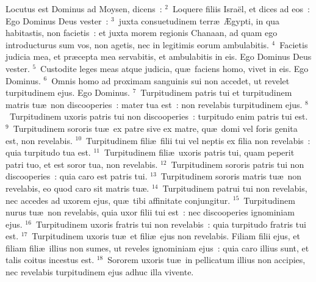 \lettrine[lines=3,image=true,loversize=0.05,lraise=-0.03]{L}{}ocutus est Dominus ad Moysen, dicens~:
${}^{2}$~Loquere filiis Isra\"el, et dices ad eos~: Ego Dominus Deus vester~:
${}^{3}$~juxta consuetudinem terr\ae\ \AE gypti, in qua habitastis, non facietis~: et juxta morem regionis Chanaan, ad quam ego introducturus sum vos, non agetis, nec in legitimis eorum ambulabitis.
${}^{4}$~Facietis judicia mea, et pr\ae cepta mea servabitis, et ambulabitis in eis. Ego Dominus Deus vester.
${}^{5}$~Custodite leges meas atque judicia, qu\ae\ faciens homo, vivet in eis. Ego Dominus.
${}^{6}$~Omnis homo ad proximam sanguinis sui non accedet, ut revelet turpitudinem ejus. Ego Dominus.
${}^{7}$~Turpitudinem patris tui et turpitudinem matris tu\ae\ non discooperies~: mater tua est~: non revelabis turpitudinem ejus.
${}^{8}$~Turpitudinem uxoris patris tui non discooperies~: turpitudo enim patris tui est.
${}^{9}$~Turpitudinem sororis tu\ae\ ex patre sive ex matre, qu\ae\ domi vel foris genita est, non revelabis.
${}^{10}$~Turpitudinem fili\ae\ filii tui vel neptis ex filia non revelabis~: quia turpitudo tua est.
${}^{11}$~Turpitudinem fili\ae\ uxoris patris tui, quam peperit patri tuo, et est soror tua, non revelabis.
${}^{12}$~Turpitudinem sororis patris tui non discooperies~: quia caro est patris tui.
${}^{13}$~Turpitudinem sororis matris tu\ae\ non revelabis, eo quod caro sit matris tu\ae .
${}^{14}$~Turpitudinem patrui tui non revelabis, nec accedes ad uxorem ejus, qu\ae\ tibi affinitate conjungitur.
${}^{15}$~Turpitudinem nurus tu\ae\ non revelabis, quia uxor filii tui est~: nec discooperies ignominiam ejus.
${}^{16}$~Turpitudinem uxoris fratris tui non revelabis~: quia turpitudo fratris tui est.
${}^{17}$~Turpitudinem uxoris tu\ae\ et fili\ae\ ejus non revelabis. Filiam filii ejus, et filiam fili\ae\ illius non sumes, ut reveles ignominiam ejus~: quia caro illius sunt, et talis coitus incestus est.
${}^{18}$~Sororem uxoris tu\ae\ in pellicatum illius non accipies, nec revelabis turpitudinem ejus adhuc illa vivente.


